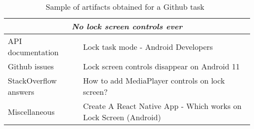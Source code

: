 \begin{table}[H]
\centering    
\begin{scriptsize}
\begin{threeparttable}
\begin{tabular}{l|l}

\hline

\multicolumn{2}{c}{\textit{No lock screen controls ever}}  \\

\hline
\hline

\multirow{1}{*}{API documentation}
& Lock task mode - Android Developers \\

\multirow{1}{*}{Github issues}
& Lock screen controls disappear on Android 11 \\


\multirow{1}{*}{StackOverflow answers}
& How to add MediaPlayer controls on lock screen? \\



\multirow{1}{*}{Miscellaneous}
& Create A React Native App - Which works on Lock Screen (Android) \\

\hline


\end{tabular}
\end{threeparttable}
\end{scriptsize}
\caption{Sample of artifacts obtained for a Github task~\cite{git3578} }
\label{tbl:googlesearch-example-git}
\end{table}

